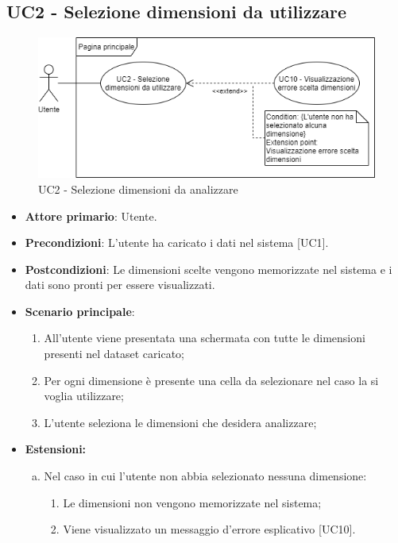 \subsection{UC2 - Selezione dimensioni da utilizzare}
\begin{figure}[h]
\includegraphics[width=\linewidth]{section/Images/UC2.png}
\centering
\caption{UC2 - Selezione dimensioni da analizzare}
\end{figure}
\begin{itemize}
	\item \textbf{Attore primario}: Utente.
	\item \textbf{Precondizioni}: L'utente ha caricato i dati nel sistema [UC1].
	\item \textbf{Postcondizioni}: Le dimensioni scelte vengono memorizzate nel sistema e i dati sono pronti per essere visualizzati.
	\item \textbf{Scenario principale}:
		\begin{enumerate}
			\item All'utente viene presentata una schermata con tutte le dimensioni presenti nel dataset caricato;
			\item Per ogni dimensione è presente una cella da selezionare nel caso la si voglia utilizzare;
			\item L'utente seleziona le dimensioni che desidera analizzare;
		\end{enumerate}
	\item \textbf{Estensioni:}
		\begin{enumerate}[(a)]
			\item Nel caso in cui l'utente non abbia selezionato nessuna dimensione:
			\begin{enumerate}[1.]
				\item Le dimensioni non vengono memorizzate nel sistema;
				\item Viene visualizzato un messaggio d'errore esplicativo [UC10].
			\end{enumerate}
		\end{enumerate}
\end{itemize}
